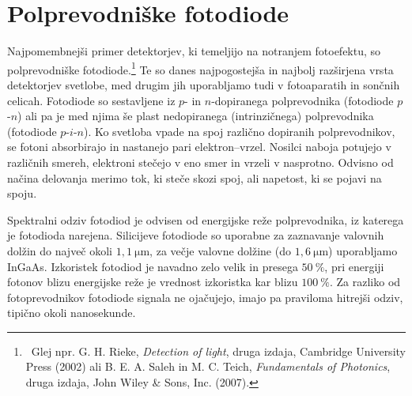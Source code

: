 \section{Polprevodniške fotodiode}
Najpomembnejši primer detektorjev, ki temeljijo na notranjem fotoefektu,
so polprevodniške fotodiode.\footnote{~Glej npr. 
G. H. Rieke, {\it Detection of light}, druga izdaja, Cambridge University Press (2002) ali
B. E. A. Saleh in M. C. Teich, {\it Fundamentals of Photonics}, druga izdaja, John Wiley \& Sons, Inc. (2007).}
Te so danes najpogostejša in najbolj razširjena vrsta detektorjev svetlobe, med drugim jih 
uporabljamo tudi v fotoaparatih in sončnih celicah. 
Fotodiode so sestavljene iz $p$- in $n$-dopiranega 
polprevodnika (fotodiode $p$-$n$) ali pa je med njima še plast nedopiranega (intrinzičnega) 
polprevodnika (fotodiode $p$-$i$-$n$). Ko svetloba vpade na spoj različno dopiranih polprevodnikov,
se fotoni absorbirajo in nastanejo 
pari elektron--vrzel. Nosilci naboja potujejo v različnih smereh, elektroni stečejo v eno smer in
vrzeli v nasprotno. Odvisno od načina delovanja merimo tok, ki steče skozi 
spoj, ali napetost, ki se pojavi na spoju. 

Spektralni odziv 
fotodiod je odvisen od energijske reže polprevodnika, 
iz katerega je fotodioda narejena.
Silicijeve  fotodiode so  uporabne za zaznavanje valovnih dolžin do največ okoli
$1,1~\si{\micro\meter}$, za večje valovne dolžine (do $1,6~\si{\micro\meter}$) 
uporabljamo InGaAs. Izkoristek fotodiod
je navadno zelo velik in presega $50~\%$, pri energiji fotonov blizu energijske reže 
je vrednost izkoristka kar blizu $100~\%$.
Za razliko od fotoprevodnikov fotodiode signala
ne ojačujejo, imajo pa praviloma hitrejši odziv, tipično okoli nanosekunde.

